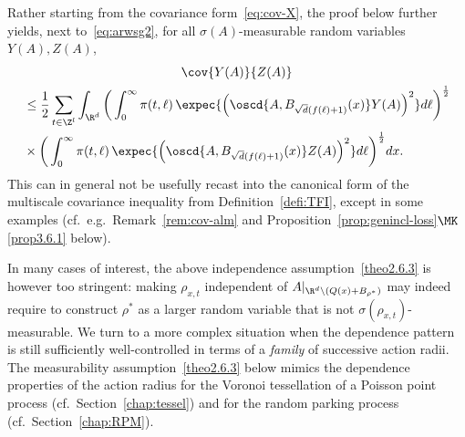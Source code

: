\begin{rema}\label{rem:ar-ci}
Rather starting from the covariance form~\eqref{eq:cov-X}, the proof below further yields, next to~\eqref{eq:arwsg2}, for all $\sigma(A)$-measurable random variables $Y(A),Z(A)$,
\begin{multline}\label{eq:arci2}
\cov{Y(A)}{Z(A)}\\
\begin{aligned}
&\le\frac12\sum_{t\in\Z^l}\int_{\R^d}\bigg(\int_0^\infty\pi(t,\ell)\,\expec{\Big(\oscd{A,B_{\sqrt d(f(\ell)+1)}(x)}Y(A)\Big)^2}d\ell\bigg)^\frac12\\
&\times\bigg(\int_0^\infty\pi(t,\ell)\,\expec{\Big(\oscd{A,B_{\sqrt d(f(\ell)+1)}(x)}Z(A)\Big)^2}d\ell\bigg)^\frac12dx.
\end{aligned}
\end{multline}
This can in general not be usefully recast into the canonical form of the multiscale covariance inequality from Definition~\ref{defi:TFI}, except in some examples (cf.~e.g.~Remark~\ref{rem:cov-alm} and Proposition~\ref{prop:genincl-loss}$\MK$\eqref{prop3.6.1} below).
\end{rema}

In many cases of interest, the above independence assumption~\eqref{theo2.6.3} is however too stringent: making $\rho_{x,t}$ independent of $A|_{\R^d\setminus(Q(x)+B_{\rho^*})}$ may indeed require to construct $\rho^*$ as a larger random variable that is not $\sigma(\rho_{x,t})$-measurable. We turn to a more complex situation when the dependence pattern is still sufficiently well-controlled in terms of a \emph{family} of successive action radii. The measurability assumption~\eqref{theo2.6.3} below mimics the dependence properties of the action radius for the Voronoi tessellation of a Poisson point process (cf.~Section~\ref{chap:tessel}) and for the random parking process (cf.~Section~\ref{chap:RPM}).

